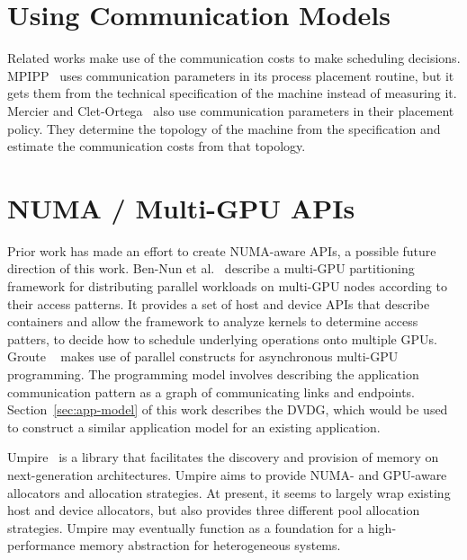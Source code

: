 \section{Using Communication Models}

Related works make use of the communication costs to make scheduling decisions.
MPIPP~\cite{chen2006mpipp} uses communication parameters in its process placement routine, but it gets them from the technical specification of the machine instead of measuring it.
Mercier and Clet-Ortega~\cite{mercier2009towards} also use communication parameters in their placement policy.
They determine the topology of the machine from the specification and estimate the communication costs from that topology.

\section{NUMA / Multi-GPU APIs}

Prior work has made an effort to create NUMA-aware APIs, a possible future direction of this work.
Ben-Nun et al.~\cite{ben2015memory} describe a multi-GPU partitioning framework for distributing parallel workloads on multi-GPU nodes according to their access patterns.
It provides a set of host and device APIs that describe containers and allow the framework to analyze kernels to determine access patters, to decide how to schedule underlying operations onto multiple GPUs.
Groute ~\cite{ben2017groute} makes use of parallel constructs for asynchronous multi-GPU programming.
The programming model involves describing the application communication pattern as a graph of communicating links and endpoints.
Section~\ref{sec:app-model} of this work describes the DVDG, which would be used to construct a similar application model for an existing application.

Umpire~\cite{beckingsale2018umpire} is a library that facilitates the discovery and provision of memory on next-generation architectures.
Umpire aims to provide NUMA- and GPU-aware allocators and allocation strategies.
At present, it seems to largely wrap existing host and device allocators, but also provides three different pool allocation strategies.
Umpire may eventually function as a foundation for a high-performance memory abstraction for heterogeneous systems.
